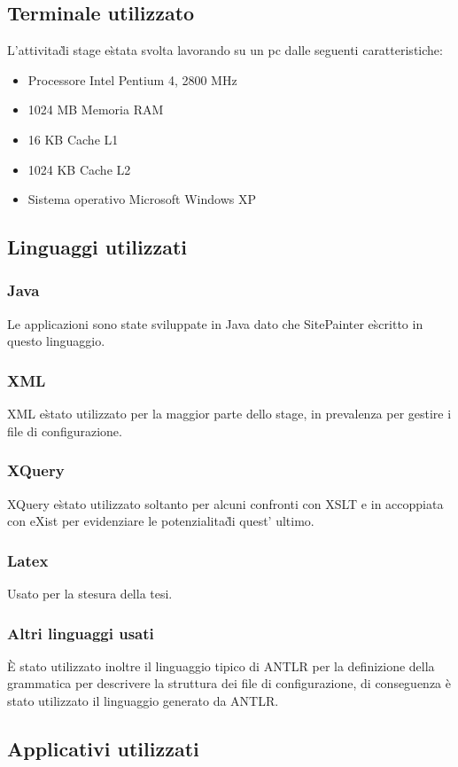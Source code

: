 \documentclass[11pt,titlepage,a4paper,twoside,openany]{book}
\begin{document}
\subsection{Terminale utilizzato}
L'attivita\` di stage e\`stata svolta lavorando su un pc dalle seguenti caratteristiche:
\begin{itemize}
 \item Processore Intel Pentium 4, 2800 MHz
 \item 1024 MB Memoria RAM
 \item 16 KB Cache L1
 \item 1024 KB Cache L2
 \item Sistema operativo Microsoft Windows XP
\end{itemize}


\subsection{Linguaggi utilizzati}
\subsubsection{Java}Le applicazioni sono state sviluppate in Java dato che SitePainter e\` scritto in questo linguaggio.
\subsubsection{XML}XML e\` stato utilizzato per la maggior parte dello stage, in prevalenza per gestire i file di configurazione.
\subsubsection{XQuery} XQuery e\` stato utilizzato soltanto per alcuni confronti con XSLT e in accoppiata con eXist per evidenziare le potenzialita\` di quest' ultimo.
\subsubsection{Latex}Usato per la stesura della tesi.
\subsubsection{Altri linguaggi usati}
\`E stato utilizzato inoltre il linguaggio tipico di ANTLR per la definizione della grammatica per descrivere la struttura dei file di configurazione, di conseguenza \`e stato utilizzato il linguaggio generato da ANTLR.
\subsection{Applicativi utilizzati}
\end{document}
